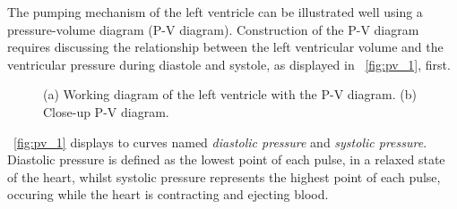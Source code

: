 The pumping mechanism of the left ventricle can be illustrated well using a pressure-volume diagram (P-V diagram). Construction of the P-V diagram requires discussing the relationship between the left ventricular volume and the ventricular pressure during diastole and systole, as displayed in \figurename~\ref{fig:pv_1}, first.
\begin{figure}[h]
  \centering
  \caption[P-V diagram \cite{GH20}]{(a) Working diagram of the left ventricle with the P-V diagram. (b) Close-up P-V diagram. \cite{GH20}}
  \label{fig:pv}
\end{figure}
\figurename~\ref{fig:pv_1} displays to curves named \textit{diastolic pressure} and \textit{systolic pressure}. Diastolic pressure is defined as the lowest point of each pulse, in a relaxed state of the heart, whilst systolic pressure represents the highest point of each pulse, occuring while the heart is contracting and ejecting blood. \cite{HKS4}
